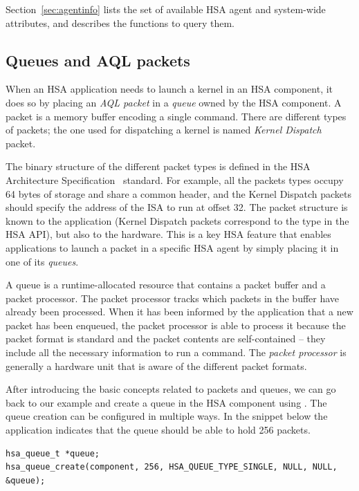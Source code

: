 \documentclass[final,oneside]{book}
\begin{document}
Section~\ref{sec:agentinfo} lists the set of available HSA agent and
system-wide attributes, and describes the functions to query them.

\subsection{Queues and AQL packets}
When an HSA application needs to launch a kernel in an HSA component, it does so
by placing an \textit{AQL packet} in a \textit{queue} owned by the HSA
component. A packet is a memory buffer encoding a single command. There are
different types of packets; the one used for dispatching a kernel is named
\emph{Kernel Dispatch} packet.

The binary structure of the different packet types is defined in the HSA
Architecture Specification~\cite{sar} standard. For example, all the packets
types occupy 64 bytes of storage and share a common header, and the Kernel
Dispatch packets should specify the address of the ISA to run at offset 32. The
packet structure is known to the application (Kernel Dispatch packets correspond
to the  type in the HSA API), but also to
the hardware. This is a key HSA feature that enables applications to launch a
packet in a specific HSA agent by simply placing it in one of its
\textit{queues}.

A queue is a runtime-allocated resource that contains a packet buffer and a
packet processor. The packet processor tracks which packets in the buffer have
already been processed. When it has been informed by the application that a new
packet has been enqueued, the packet processor is able to process it because the
packet format is standard and the packet contents are self-contained -- they
include all the necessary information to run a command. The \textit{packet
  processor} is generally a hardware unit that is aware of the different packet
formats.

After introducing the basic concepts related to packets and queues, we can go
back to our example and create a queue in the HSA component using
. The queue creation can be configured in multiple
ways. In the snippet below the application indicates that the queue should
be able to hold 256 packets.
\begin{lstlisting}
hsa_queue_t *queue;
hsa_queue_create(component, 256, HSA_QUEUE_TYPE_SINGLE, NULL, NULL, &queue);
\end{lstlisting}
\end{document}
